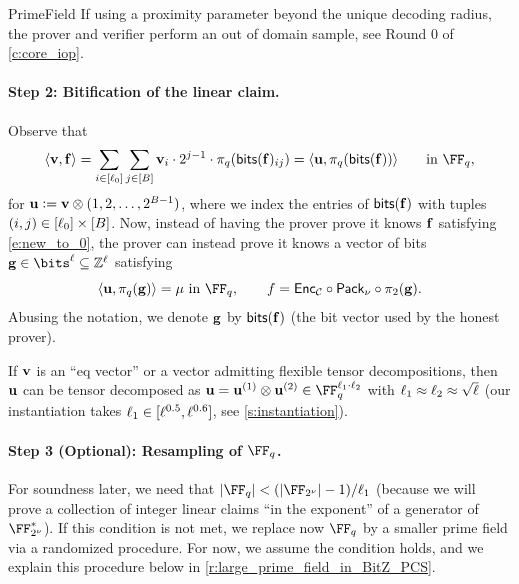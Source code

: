 \begin{lncsmove}{PrimeField}
    If using a proximity parameter beyond the unique decoding radius, the prover and verifier perform an out of domain sample, see Round 0 of \cref{c:core_iop}.


\paragraph{Step 2: Bitification of the linear claim.}  Observe that $$\langle \vv,\bff\rangle =  \sum_{i\in [\codedim_0]} \sum_{j\in [B]}\vv_i \cdot 2^{j-1}\cdot \pi_q(\bitstext(\bff)_{ij}) = \langle \uu, \pi_q(\bitstext(\bff))\rangle \qquad \text{in } \FF_q,$$ for $\mathbf{u}{\;\vcentcolon=\;} \mathbf{v}\otimes(1,2,\ldots, 2^{B-1})$, where we index the entries of $\mathsf{bits}(\mathbf{f})$ with tuples $(i,j)\in [\ell_0]\times[B]$.  Now, instead of having the prover prove it knows $\mathbf{f}$ satisfying \eqref{e:new_to_0}, the prover can instead prove it knows a vector of bits $\bfg\in \bits^\codedim \subseteq \ZZ^\codedim$ satisfying \begin{equation}\label{e:intro_eq_2}\langle \uu, \pi_q(\bfg)\rangle =\mu \ \text{in  } \FF_q, \qquad f = \Enc_\cC\circ \pack \circ \pi_2(\bfg).
\end{equation} 
Abusing the notation, we denote $\mathbf{g}$ by $\mathsf{bits}(\mathbf{f})$ (the bit vector used by the honest prover).

%
If $\mathbf{v}$ is an ``eq vector'' or a vector admitting flexible tensor decompositions, then $\mathbf{u}$ can be tensor decomposed as $\uu= \uu^{(1)} \otimes \uu^{(2)} \in \FF_q^{\codedim_1 \cdot \codedim_2}$ with  $\ell_1\approx \ell_2\approx \sqrt{\ell}$ (our instantiation takes $\ell_1\in [\ell^{0.5},\ell^{0.6}]$, see \cref{s:instantiation}). 



 \paragraph{Step 3 (Optional):  Resampling of $\FF_q$.}  For soundness later, we need that $|\FF_q|< \fieldboundsizeexponent$ (because we will prove a collection of integer linear claims ``in the exponent'' of a generator of $\comfield^*$). If this condition is not met, we replace now $\FF_q$ by a smaller prime field via a randomized procedure. For now, we assume the condition holds, and we explain this procedure below in \cref{r:large_prime_field_in_BitZ_PCS}. 



\end{lncsmove}

